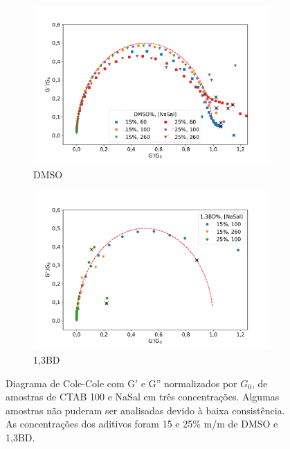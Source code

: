 		\begin{figure}[h]
			\begin{subfigure}[t]{0.5\textwidth}
				\centering
				\includegraphics[width=\textwidth]{imagens/reologia/colecole_dmso}
				\caption{DMSO}
				\label{fig:colecole_dmso}
			\end{subfigure} %
			\begin{subfigure}[t]{0.5\textwidth}
				\centering
				\includegraphics[width=\textwidth]{imagens/reologia/colecole_13bd}
				\caption{1,3BD}
				\label{fig:colecole_13bd}
			\end{subfigure} %
			\caption{Diagrama de Cole-Cole com G' e G'' normalizados por \(G_0\), de amostras de CTAB 100 \mM{} e NaSal em três concentrações. Algumas amostras não puderam ser analisadas devido à baixa consistência. As concentrações dos aditivos foram 15 e 25\% m/m de DMSO e 1,3BD.}
			\label{fig:colecole_dmso_13bd}
		\end{figure}
		
